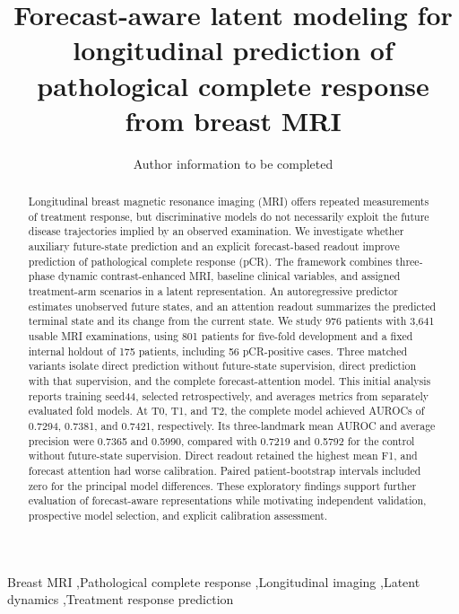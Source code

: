 \documentclass[preprint,12pt,authoryear]{elsarticle}
\begin{document}
\begin{frontmatter}
\title{Forecast-aware latent modeling for longitudinal prediction of pathological complete response from breast MRI}
\author{Author information to be completed}
\address{Affiliations and corresponding author to be completed}
\begin{abstract}
Longitudinal breast magnetic resonance imaging (MRI) offers repeated measurements of treatment response, but discriminative models do not necessarily exploit the future disease trajectories implied by an observed examination. We investigate whether auxiliary future-state prediction and an explicit forecast-based readout improve prediction of pathological complete response (pCR). The framework combines three-phase dynamic contrast-enhanced MRI, baseline clinical variables, and assigned treatment-arm scenarios in a latent representation. An autoregressive predictor estimates unobserved future states, and an attention readout summarizes the predicted terminal state and its change from the current state. We study 976 patients with 3,641 usable MRI examinations, using 801 patients for five-fold development and a fixed internal holdout of 175 patients, including 56 pCR-positive cases. Three matched variants isolate direct prediction without future-state supervision, direct prediction with that supervision, and the complete forecast-attention model. This initial analysis reports training seed44, selected retrospectively, and averages metrics from separately evaluated fold models. At T0, T1, and T2, the complete model achieved AUROCs of 0.7294, 0.7381, and 0.7421, respectively. Its three-landmark mean AUROC and average precision were 0.7365 and 0.5990, compared with 0.7219 and 0.5792 for the control without future-state supervision. Direct readout retained the highest mean F1, and forecast attention had worse calibration. Paired patient-bootstrap intervals included zero for the principal model differences. These exploratory findings support further evaluation of forecast-aware representations while motivating independent validation, prospective model selection, and explicit calibration assessment.
\end{abstract}
\begin{keyword}
Breast MRI \sep Pathological complete response \sep Longitudinal imaging \sep Latent dynamics \sep Treatment response prediction
\end{keyword}
\end{frontmatter}








\end{document}
